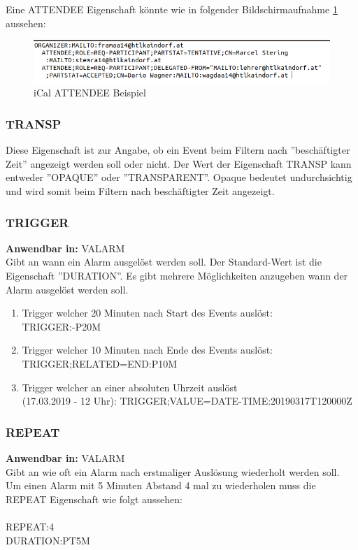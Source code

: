 Eine ATTENDEE Eigenschaft könnte wie in folgender Bildschirmaufnahme \ref{fig:icalattendee} aussehen: \\
\begin{figure}[h]
	\centering
    \includegraphics[width=\textwidth]{images/iCal_Format_attendee}
    \caption{iCal ATTENDEE Beispiel}
    \label{fig:icalattendee}
\end{figure}
\subsubsection{TRANSP}
\label{sec:transp}
Diese Eigenschaft ist zur Angabe, ob ein Event beim Filtern nach ''beschäftigter Zeit'' angezeigt werden soll oder nicht. Der Wert der Eigenschaft TRANSP kann entweder ''OPAQUE'' oder ''TRANSPARENT''. Opaque bedeutet undurchsichtig und wird somit beim Filtern nach beschäftigter Zeit angezeigt.
\subsubsection{TRIGGER}
\label{sec:trigger}
\textbf{Anwendbar in:} VALARM \\
Gibt an wann ein Alarm ausgelöst werden soll. Der Standard-Wert ist die Eigenschaft ''DURATION''. Es gibt mehrere Möglichkeiten anzugeben wann der Alarm ausgelöst werden soll. 
\begin{enumerate}
\item Trigger welcher 20 Minuten nach Start des Events auslöst: \\TRIGGER:-P20M\\
\item Trigger welcher 10 Minuten nach Ende des Events auslöst: \\TRIGGER;RELATED=END:P10M\\
\item Trigger welcher an einer absoluten Uhrzeit auslöst \\(17.03.2019 - 12 Uhr): TRIGGER;VALUE=DATE-TIME:20190317T120000Z\\
\end{enumerate}
\subsubsection{REPEAT}
\label{sec:repeat}
\textbf{Anwendbar in:} VALARM \\
Gibt an wie oft ein Alarm nach erstmaliger Auslösung wiederholt werden soll. Um einen Alarm mit 5 Minuten Abstand 4 mal zu wiederholen muss die REPEAT Eigenschaft wie folgt aussehen: \\ \\ REPEAT:4\\DURATION:PT5M
